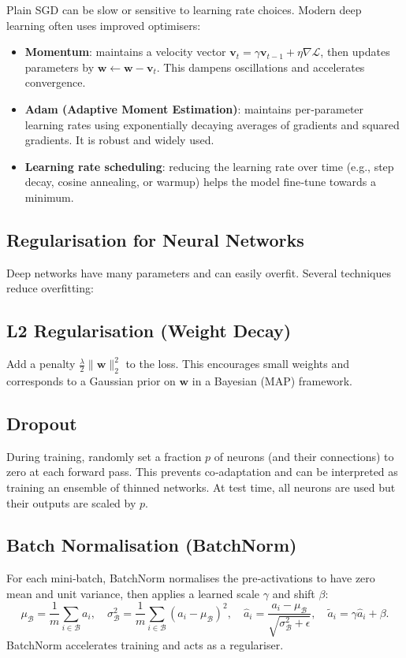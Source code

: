 \documentclass{tufte-handout}
\let\subsubsection\subsection
\begin{document}
Plain SGD can be slow or sensitive to learning rate choices. Modern deep learning often uses improved optimisers:

\begin{itemize}
    \item \textbf{Momentum}: maintains a velocity vector $\mathbf{v}_t = \gamma \mathbf{v}_{t-1} + \eta \nabla \mathcal{L}$, then updates parameters by $\mathbf{w} \leftarrow \mathbf{w} - \mathbf{v}_t$. This dampens oscillations and accelerates convergence.
    \item \textbf{Adam (Adaptive Moment Estimation)}: maintains per‑parameter learning rates using exponentially decaying averages of gradients and squared gradients. It is robust and widely used.
    \item \textbf{Learning rate scheduling}: reducing the learning rate over time (e.g., step decay, cosine annealing, or warmup) helps the model fine‑tune towards a minimum.
\end{itemize}

\subsection{Regularisation for Neural Networks}

Deep networks have many parameters and can easily overfit. Several techniques reduce overfitting:

\subsubsection{L2 Regularisation (Weight Decay)}
Add a penalty $\frac{\lambda}{2}\|\mathbf{w}\|_2^2$ to the loss. This encourages small weights and corresponds to a Gaussian prior on $\mathbf{w}$ in a Bayesian (MAP) framework.

\subsubsection{Dropout}
During training, randomly set a fraction $p$ of neurons (and their connections) to zero at each forward pass. This prevents co‑adaptation and can be interpreted as training an ensemble of thinned networks. At test time, all neurons are used but their outputs are scaled by $p$.

\subsubsection{Batch Normalisation (BatchNorm)}
For each mini‑batch, BatchNorm normalises the pre‑activations to have zero mean and unit variance, then applies a learned scale $\gamma$ and shift $\beta$:
\[
\mu_{\mathcal{B}} = \frac{1}{m}\sum_{i\in\mathcal{B}} a_i,\quad \sigma_{\mathcal{B}}^2 = \frac{1}{m}\sum_{i\in\mathcal{B}} (a_i-\mu_{\mathcal{B}})^2,\quad \hat{a}_i = \frac{a_i-\mu_{\mathcal{B}}}{\sqrt{\sigma_{\mathcal{B}}^2+\epsilon}},\quad \tilde{a}_i = \gamma\hat{a}_i+\beta.
\]
BatchNorm accelerates training and acts as a regulariser.
\end{document}
